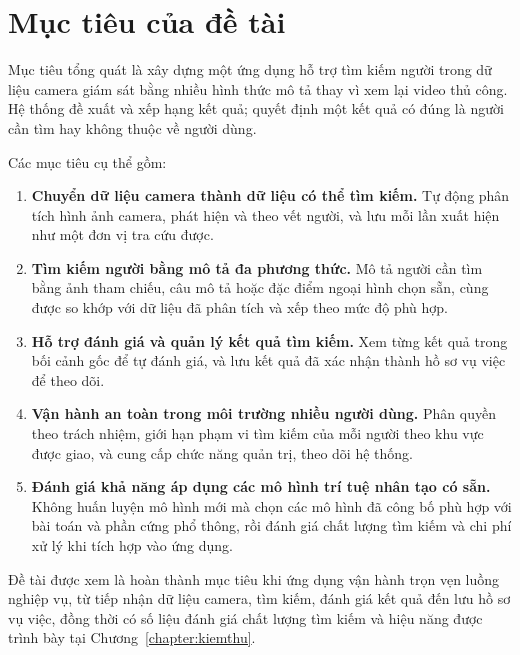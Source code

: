 \section{Mục tiêu của đề tài}
\label{sec:1.2}

Mục tiêu tổng quát là xây dựng một ứng dụng hỗ trợ tìm kiếm người trong dữ liệu camera giám sát bằng nhiều hình thức mô tả thay vì xem lại video thủ công. Hệ thống đề xuất và xếp hạng kết quả; quyết định một kết quả có đúng là người cần tìm hay không thuộc về người dùng.

Các mục tiêu cụ thể gồm:

\begin{enumerate}
    \item \textbf{Chuyển dữ liệu camera thành dữ liệu có thể tìm kiếm.} Tự động phân tích hình ảnh camera, phát hiện và theo vết người, và lưu mỗi lần xuất hiện như một đơn vị tra cứu được.

    \item \textbf{Tìm kiếm người bằng mô tả đa phương thức.} Mô tả người cần tìm bằng ảnh tham chiếu, câu mô tả hoặc đặc điểm ngoại hình chọn sẵn, cùng được so khớp với dữ liệu đã phân tích và xếp theo mức độ phù hợp.

    \item \textbf{Hỗ trợ đánh giá và quản lý kết quả tìm kiếm.} Xem từng kết quả trong bối cảnh gốc để tự đánh giá, và lưu kết quả đã xác nhận thành hồ sơ vụ việc để theo dõi.

    \item \textbf{Vận hành an toàn trong môi trường nhiều người dùng.} Phân quyền theo trách nhiệm, giới hạn phạm vi tìm kiếm của mỗi người theo khu vực được giao, và cung cấp chức năng quản trị, theo dõi hệ thống.

    \item \textbf{Đánh giá khả năng áp dụng các mô hình trí tuệ nhân tạo có sẵn.} Không huấn luyện mô hình mới mà chọn các mô hình đã công bố phù hợp với bài toán và phần cứng phổ thông, rồi đánh giá chất lượng tìm kiếm và chi phí xử lý khi tích hợp vào ứng dụng.
\end{enumerate}

Đề tài được xem là hoàn thành mục tiêu khi ứng dụng vận hành trọn vẹn luồng nghiệp vụ, từ tiếp nhận dữ liệu camera, tìm kiếm, đánh giá kết quả đến lưu hồ sơ vụ việc, đồng thời có số liệu đánh giá chất lượng tìm kiếm và hiệu năng được trình bày tại Chương~\ref{chapter:kiemthu}.
